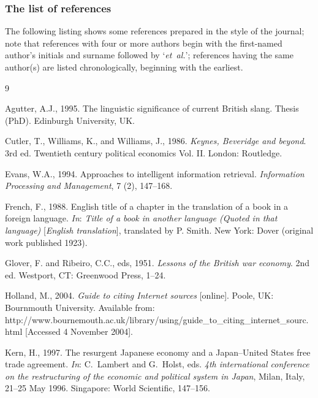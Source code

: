\documentclass[]{tGIS2e}
\begin{document}
\subsubsection{The list of references} The following listing shows some references prepared in the style of the
journal; note that references with four or more authors begin with the first-named author's initials and
surname followed by `{\em{et~al.}}'; references having the same author(s) are listed chronologically, beginning with the earliest.
%
%
\begin{thebibliography}{9}


Agutter, A.J., 1995. The linguistic significance of current British slang.
  Thesis (PhD). Edinburgh University, UK.

Cutler, T., Williams, K., and Williams, J., 1986. {\itshape Keynes, Beveridge and
  beyond}. 3rd ed. Twentieth century political economics Vol. II. London:
  Routledge.

Evans, W.A., 1994. Approaches to intelligent information retrieval. {\itshape
  Information Processing and Management}, 7 (2), 147--168.

French, F., 1988. English title of a chapter in the translation of a book in a
  foreign language.  {\itshape{In}}: {\itshape Title of a book in another language (Quoted in
  that language)}  [{\itshape English translation}],  translated by P. Smith.
  New York: Dover (original work published 1923).

Glover, F. and Ribeiro, C.C., eds, 1951. {\itshape
Lessons of the British war economy}. 2nd ed. Westport, CT: Greenwood Press, 1--24.

Holland, M., 2004. {\itshape Guide to citing Internet sources} [online]. Poole, UK: Bournmouth University. Available from:
  http://www.bournemouth.ac.uk/library/using/guide\_to\_citing\_internet\_sourc.%
  html [Accessed 4 November 2004].

Kern, H., 1997. The resurgent Japanese economy and a Japan--United States free trade
  agreement. {\itshape {In}}: C.~Lambert and G.~Holst, eds. {\itshape 4th international conference on the restructuring of the economic and political system in Japan}, Milan, Italy, 21--25 May 1996. Singapore: World Scientific, 147--156.


\end{thebibliography}
\end{document}
